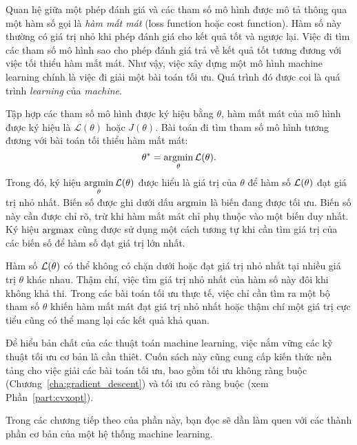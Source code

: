 Quan hệ giữa một phép đánh giá và các tham số mô hình được mô tả thông qua một
hàm số gọi là \textit{hàm mất mát} ({loss function} hoặc
{cost function}). Hàm số này thường có giá trị nhỏ khi
phép đánh giá cho kết quả tốt và ngược lại. Việc đi tìm các tham số mô hình sao
cho phép đánh giá trả về kết quả tốt tương đương với việc tối thiểu hàm mất mát.
Như vậy, việc xây dựng một mô hình machine learning chính là việc đi giải một
bài toán tối ưu. Quá trình đó được coi là quá trình \textit{learning} của
\textit{machine}.

Tập hợp các tham số mô hình được ký hiệu bằng $\theta$, hàm mất mát của
mô hình được ký hiệu là $\mathcal{L}(\theta)$ hoặc $J(\theta)$. Bài toán đi tìm tham số mô hình tương đương với bài toán tối thiểu hàm mất mát:
\begin{equation}
\theta^* = \operatorname*{argmin}_{\theta}\mathcal{L}(\theta).
\end{equation}
Trong đó, ký hiệu $\displaystyle \operatorname*{argmin}_{\theta}\mathcal{L}(\theta)$ được hiểu là giá
trị của $\theta$ để hàm số $\mathcal{L}(\theta)$ đạt giá trị nhỏ nhất. Biến số được ghi
dưới dấu $\operatorname*{argmin}$ là biến đang được tối ưu. Biến số này cần được chỉ rõ, trừ
khi hàm mất mát chỉ phụ thuộc vào một biến duy nhất. Ký hiệu $\operatorname*{argmax}$ cũng được
sử dụng một cách tương tự khi cần tìm giá trị của các biến số để hàm số đạt giá
trị lớn nhất.

Hàm số $\mathcal{L}(\theta)$ có thể không có chặn dưới hoặc đạt giá trị nhỏ nhất tại
nhiều giá trị $\theta$ khác nhau. Thậm chí, việc tìm giá trị nhỏ nhất của hàm số
này đôi khi không khả thi. Trong các bài toán tối ưu thực tế, việc chỉ cần tìm
ra một bộ tham số $\theta$ khiến hàm mất mát đạt giá trị nhỏ nhất hoặc thậm chí
một giá trị cực tiểu cũng có thể mang lại các kết quả khả quan.

Để hiểu bản chất của các thuật toán machine learning, việc nắm vững các kỹ
thuật tối ưu cơ bản là cần thiêt. Cuốn sách này cũng cung cấp kiến thức nền tảng cho việc giải các bài toán tối ưu, bao gồm tối ưu không ràng buộc
(Chương~\ref{cha:gradient_descent}) và tối ưu có ràng buộc (xem
Phần~\ref{part:cvxopt}).

Trong các chương tiếp theo của phần này, bạn đọc sẽ dần làm quen với các
thành phần cơ bản của một hệ thống machine learning.


